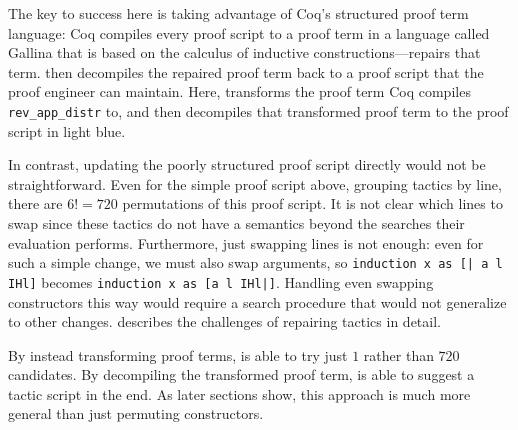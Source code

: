 The key to success here is taking advantage of Coq's structured proof term language:
Coq compiles every proof script to a proof term in a language called Gallina that is based on the calculus of inductive 
constructions---\toolname repairs that term.
\toolname then decompiles the repaired proof term back to a proof script that the proof engineer can maintain.
Here, \toolname transforms the proof term Coq compiles \lstinline{rev_app_distr} to,
and then decompiles that transformed proof term to the proof script in light blue.

In contrast, updating the poorly structured proof script directly would not be straightforward.
Even for the simple proof script above, grouping tactics by line, there are $6! = 720$ permutations of this proof script.
It is not clear which lines to swap since these tactics do not have a semantics beyond the searches their evaluation performs.
Furthermore, just swapping lines is not enough: even for such a simple change, we must also swap
arguments, so \lstinline{induction x as [| a l IHl]} becomes \lstinline{induction x as [a l IHl|]}.
Handling even swapping constructors this way would require a search procedure that would not generalize to other changes.
\citet{robert2018} describes the challenges of repairing tactics in detail.

By instead transforming proof terms, \toolname is able to try just $1$ rather than $720$ candidates.
By decompiling the transformed proof term, \toolname is able to suggest a tactic script in the end.
As later sections show, this approach is much more general than just permuting constructors.



